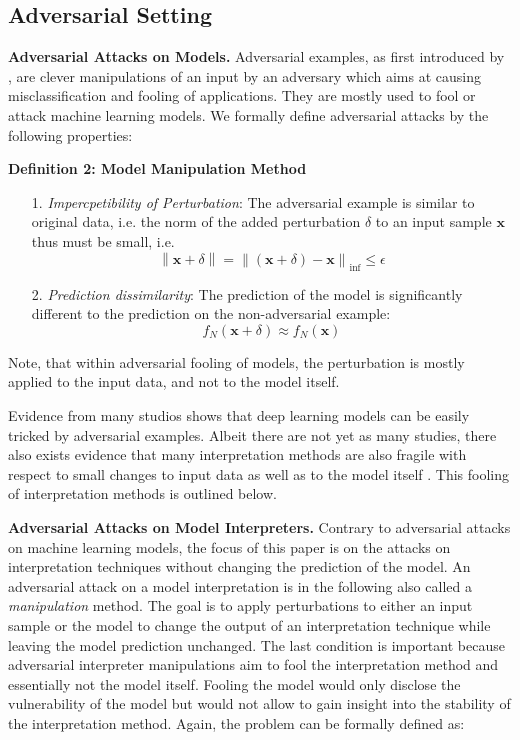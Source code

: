 \documentclass[sigconf]{acmart}
\newcommand{\norm}[1]{\left\lVert#1\right\rVert}
\newcommand{\mypar}[1]{\vspace{0.2cm}\noindent\textbf{#1}}
\begin{document}
\subsection{Adversarial Setting}
\label{subsec:adversarial_setting}
\mypar{Adversarial Attacks on Models. }
Adversarial examples, as first introduced by \cite{szegedy_intriguing}, are clever manipulations of an input by an adversary which aims at causing misclassification and fooling of applications. They are mostly used to fool or attack machine learning models. We formally define adversarial attacks by the following properties: 
\par\smallskip
\textbf{Definition 2: Model Manipulation Method}
\begin{enumerate}
    \item[1.] \textit{Impercpetibility of Perturbation}: The adversarial example is similar to original data, i.e. the norm of the added perturbation $\delta$ to an input sample $\mathbf{x}$ thus must be small, i.e. $$\norm{\mathbf{x}+\delta} = \norm{(\mathbf{x}+\delta)-\mathbf{x}}_{\inf} \leq \epsilon$$
    \item[2.] \textit{Prediction dissimilarity}: The prediction of the model is significantly different to the prediction on the non-adversarial example: $$f_N(\mathbf{x}+\delta) \approx f_N(\mathbf{x})$$
\end{enumerate}
Note, that within adversarial fooling of models, the perturbation is mostly applied to the input data, and not to the model itself.

Evidence from many studios shows that deep learning models can be easily tricked by adversarial examples. 
Albeit there are not yet as many studies, there also exists evidence that many interpretation methods are also fragile with respect to small changes to input data \cite{adebayo2018sanity, samek2019explainable, alvarez2018towards} as well as to the model itself \cite{fooling_nn_interpreters, dimanov2020you}. This fooling of interpretation methods is outlined below. 

\mypar{Adversarial Attacks on Model Interpreters. } 
Contrary to adversarial attacks on machine learning models, the focus of this paper is on the attacks on interpretation techniques without changing the prediction of the model. 
An adversarial attack on a model interpretation is in the following also called a \textit{manipulation} method. 
The goal is to apply perturbations to either an input sample or the model to change the output of an interpretation technique while leaving the model prediction unchanged. The last condition is important because adversarial interpreter manipulations aim to fool the interpretation method and essentially not the model itself. 
Fooling the model would only disclose the vulnerability of the model but would not allow to gain insight into the stability of the interpretation method. 
Again, the problem can be formally defined as:
\end{document}
